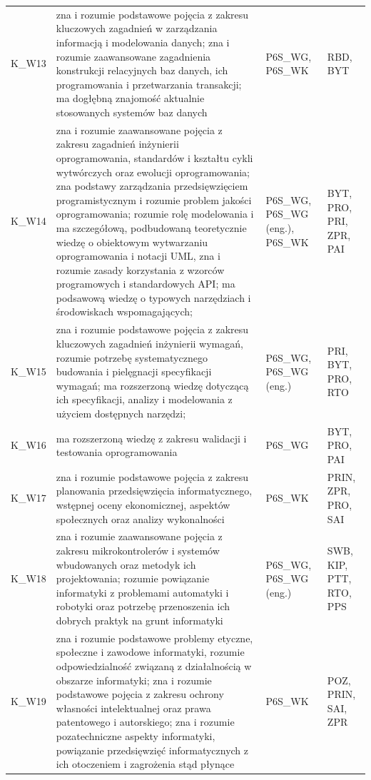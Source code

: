 \documentclass[12pt,a4paper]{article}
\begin{document}
{\begin{longtable}{m{1cm}m{8.8cm}m{2.1cm}m{2.5cm}}
\rowcolor{tableRowLight} K\_W13 & zna i rozumie podstawowe pojęcia z zakresu kluczowych zagadnień w zarządzania informacją i modelowania danych; zna i rozumie zaawansowane zagadnienia konstrukcji relacyjnych baz danych, ich programowania i przetwarzania transakcji; ma dogłębną znajomość aktualnie stosowanych systemów baz danych & {\scriptsize P6S\_WG, P6S\_WK} & {\scriptsize RBD, BYT} \\
\rowcolor{tableRowAlt} K\_W14 & zna i rozumie zaawansowane pojęcia z zakresu zagadnień inżynierii oprogramowania, standardów i kształtu cykli wytwórczych oraz ewolucji oprogramowania; zna podstawy zarządzania przedsięwzięciem programistycznym i rozumie problem jakości oprogramowania; rozumie rolę modelowania i ma szczegółową, podbudowaną teoretycznie wiedzę o obiektowym wytwarzaniu oprogramowania i notacji UML, zna i rozumie zasady korzystania z wzorców programowych i standardowych API; ma podsawową wiedzę o typowych narzędziach i środowiskach wspomagających; & {\scriptsize P6S\_WG, P6S\_WG {\scriptsize (eng.)}, P6S\_WK} & {\scriptsize BYT, PRO, PRI, ZPR, PAI} \\
\rowcolor{tableRowLight} K\_W15 & zna i rozumie podstawowe pojęcia z zakresu kluczowych zagadnień inżynierii wymagań, rozumie potrzebę systematycznego budowania i pielęgnacji specyfikacji wymagań; ma rozszerzoną wiedzę dotyczącą ich specyfikacji, analizy i modelowania z użyciem dostępnych narzędzi; & {\scriptsize P6S\_WG, P6S\_WG {\scriptsize (eng.)}} & {\scriptsize PRI, BYT, PRO, RTO} \\
\rowcolor{tableRowAlt} K\_W16 & ma rozszerzoną wiedzę z zakresu walidacji i testowania oprogramowania & {\scriptsize P6S\_WG} & {\scriptsize BYT, PRO, PAI} \\
\rowcolor{tableRowLight} K\_W17 & zna i rozumie podstawowe pojęcia z zakresu planowania przedsięwzięcia informatycznego, wstępnej oceny ekonomicznej, aspektów społecznych oraz analizy wykonalności & {\scriptsize P6S\_WK} & {\scriptsize PRIN, ZPR, PRO, SAI} \\
\rowcolor{tableRowAlt} K\_W18 & zna i rozumie zaawansowane pojęcia z zakresu mikrokontrolerów i systemów wbudowanych oraz metodyk ich projektowania; rozumie powiązanie informatyki z problemami automatyki i robotyki oraz potrzebę przenoszenia ich dobrych praktyk na grunt informatyki & {\scriptsize P6S\_WG, P6S\_WG {\scriptsize (eng.)}} & {\scriptsize SWB, KIP, PTT, RTO, PPS} \\
\rowcolor{tableRowLight} K\_W19 & zna i rozumie podstawowe problemy etyczne, społeczne i zawodowe informatyki, rozumie odpowiedzialność związaną z działalnością w obszarze informatyki; zna i rozumie podstawowe pojęcia z zakresu ochrony własności intelektualnej oraz prawa patentowego i autorskiego; zna i rozumie pozatechniczne aspekty informatyki, powiązanie przedsięwzięć informatycznych z ich otoczeniem i zagrożenia stąd płynące & {\scriptsize P6S\_WK} & {\scriptsize POZ, PRIN, SAI, ZPR} \\

\end{longtable}}
\end{document}
